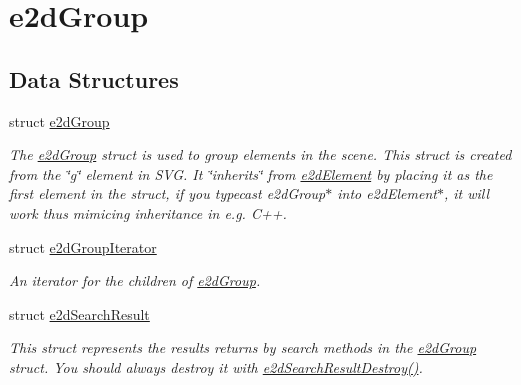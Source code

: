 \hypertarget{group__e2dGroup}{\section{e2d\-Group}
\label{group__e2dGroup}
}
\subsection*{Data Structures}
\begin{DoxyCompactItemize}
\item 
struct \hyperlink{structe2dGroup}{e2d\-Group}
\begin{DoxyCompactList}\small\item\em The \hyperlink{structe2dGroup}{e2d\-Group} struct is used to group elements in the scene. This struct is created from the \char`\"{}g\char`\"{} element in S\-V\-G. It \char`\"{}inherits\char`\"{} from \hyperlink{structe2dElement}{e2d\-Element} by placing it as the first element in the struct, if you typecast e2d\-Group$\ast$ into e2d\-Element$\ast$, it will work thus mimicing inheritance in e.\-g. C++. \end{DoxyCompactList}\item 
struct \hyperlink{structe2dGroupIterator}{e2d\-Group\-Iterator}
\begin{DoxyCompactList}\small\item\em An iterator for the children of \hyperlink{structe2dGroup}{e2d\-Group}. \end{DoxyCompactList}\item 
struct \hyperlink{structe2dSearchResult}{e2d\-Search\-Result}
\begin{DoxyCompactList}\small\item\em This struct represents the results returns by search methods in the \hyperlink{structe2dGroup}{e2d\-Group} struct. You should always destroy it with \hyperlink{group__e2dGroup_ga0775c9a7e2ec5311263f84339afb52bc}{e2d\-Search\-Result\-Destroy()}. \end{DoxyCompactList}\end{DoxyCompactItemize}
